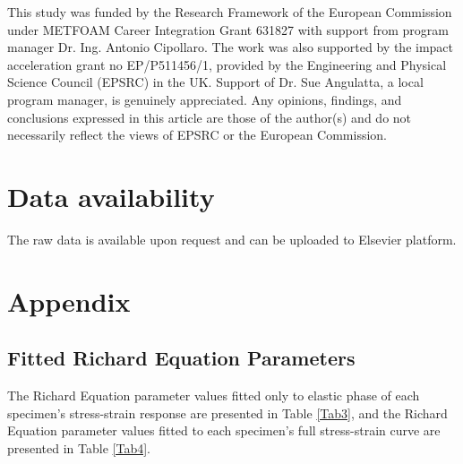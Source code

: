 \documentclass[review]{elsarticle}
\begin{document}
{This study was funded by the Research Framework of the European Commission under METFOAM Career Integration Grant 631827 with support from program manager Dr. Ing. Antonio Cipollaro. The work was also supported by the impact acceleration grant no EP/P511456/1, provided by the Engineering and Physical Science Council (EPSRC) in the UK. Support of Dr. Sue Angulatta, a local program manager, is genuinely appreciated. Any opinions, findings, and conclusions expressed in this article are those of the author(s) and do not necessarily reflect the views of EPSRC or the European Commission. 

\section*{Data availability}

The raw data is available upon request and can be uploaded to Elsevier platform.



\section*{Appendix}

\subsection*{Fitted Richard Equation Parameters}

The Richard Equation parameter values fitted only to elastic phase of each specimen’s stress-strain response are presented in Table \ref{Tab3}, and the Richard Equation parameter values fitted to each specimen’s full stress-strain curve are presented in Table \ref{Tab4}.

\begin{landscape}



\end{landscape}}
\end{document}
